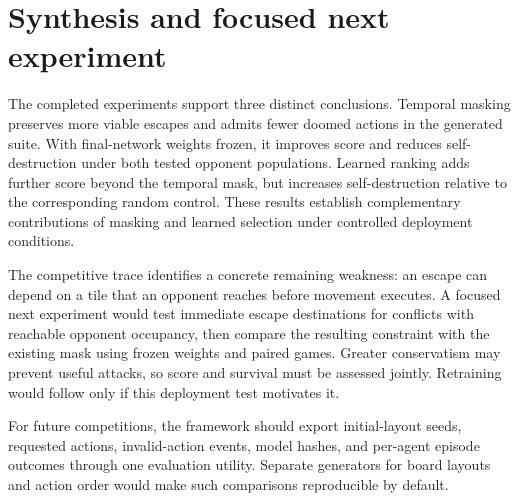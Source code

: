 \section{Synthesis and focused next experiment}
\label{sec:jesper-synthesis}
The completed experiments support three distinct conclusions. Temporal
masking preserves more viable escapes and admits fewer doomed actions in
the generated suite. With final-network weights frozen, it improves score
and reduces self-destruction under both tested opponent populations.
Learned ranking adds further score beyond the temporal mask, but increases
self-destruction relative to the corresponding random control. These
results establish complementary contributions of masking and learned
selection under controlled deployment conditions.

The competitive trace identifies a concrete remaining weakness: an escape
can depend on a tile that an opponent reaches before movement executes.
A focused next experiment would test immediate escape destinations for
conflicts with reachable opponent occupancy, then compare the resulting
constraint with the existing mask using frozen weights and paired games.
Greater conservatism may prevent useful attacks, so score and survival
must be assessed jointly. Retraining would follow only if this deployment
test motivates it.

For future competitions, the framework should export initial-layout seeds,
requested actions, invalid-action events, model hashes, and per-agent
episode outcomes through one evaluation utility. Separate generators for
board layouts and action order would make such comparisons reproducible
by default.
